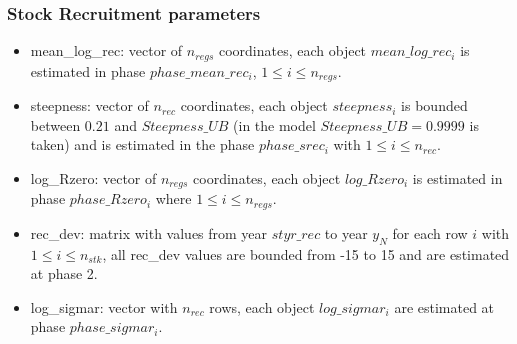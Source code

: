 \documentclass{article}
\begin{document}
\subsubsection{Stock Recruitment parameters}
\begin{itemize}
    \item mean\_log\_rec:
    vector of $n_{regs}$ coordinates, each object $mean\_log\_rec_i$ is estimated in phase $phase\_mean\_rec_i$, $1 \leq i \leq n_{regs}$. 
    
    \item steepness: vector of $n_{rec}$ coordinates, each object $steepness_i$ is bounded between $0.21$ and $Steepness\_UB$ (in the model $Steepness\_UB=0.9999$ is taken) and is estimated in the phase $phase\_srec_i$ with $1\leq i \leq n_{rec}$.


    
    \item log\_Rzero: vector of $n_{regs}$ coordinates, each object $log\_Rzero_i$ is estimated in phase $phase\_Rzero_i$ where $1 \leq i \leq n_{regs}$.
    
    \item rec\_dev: matrix with values from year $styr\_rec$ to year $y_N$ for each row $i$ with $1\leq i \leq n_{stk}$, all rec\_dev values are bounded from -15 to 15 and are estimated at phase 2.

    \item log\_sigmar: vector with $n_{rec}$ rows, each object $log\_sigmar_i$  are estimated at phase $phase\_sigmar_i$.
\end{itemize}
\end{document}
